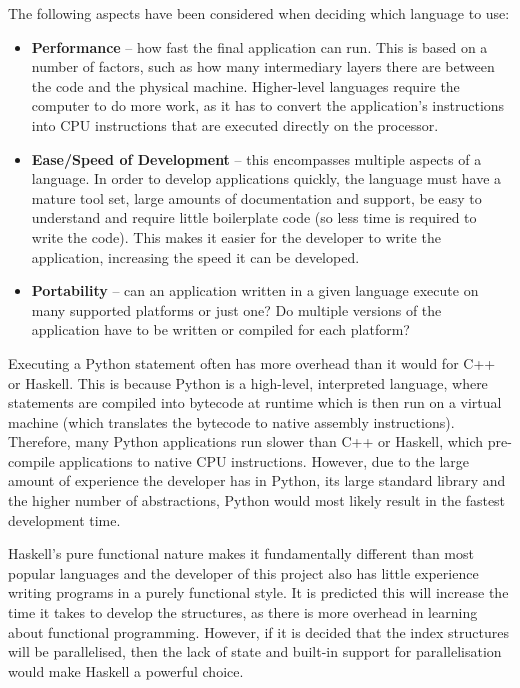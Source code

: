The following aspects have been considered when deciding which language to use:
\begin{itemize}
	\item \textbf{Performance} -- how fast the final application can run. This is based on a number of factors, such as how many intermediary layers there are between the code and the physical machine. Higher-level languages require the computer to do more work, as it has to convert the application's instructions into CPU instructions that are executed directly on the processor.
	\item \textbf{Ease/Speed of Development} -- this encompasses multiple aspects of a language. In order to develop applications quickly, the language must have a mature tool set, large amounts of documentation and support, be easy to understand and require little boilerplate code (so less time is required to write the code). This makes it easier for the developer to write the application, increasing the speed it can be developed.
	\item \textbf{Portability} -- can an application written in a given language execute on many supported platforms or just one? Do multiple versions of the application have to be written or compiled for each platform?
\end{itemize}
 
Executing a Python statement often has more overhead than it would for C++ or Haskell. This is because Python is a high-level, interpreted language, where statements are compiled into bytecode at runtime which is then run on a virtual machine (which translates the bytecode to native assembly instructions). Therefore, many Python applications run slower than C++ or Haskell, which pre-compile applications to native CPU instructions. However, due to the large amount of experience the developer has in Python, its large standard library and the higher number of abstractions, Python would most likely result in the fastest development time. 

Haskell's pure functional nature makes it fundamentally different than most popular languages and the developer of this project also has little experience writing programs in a purely functional style. It is predicted this will increase the time it takes to develop the structures, as there is more overhead in learning about functional programming. However, if it is decided that the index structures will be parallelised, then the lack of state and built-in support for parallelisation \cite{parallel-haskell} would make Haskell a powerful choice.


